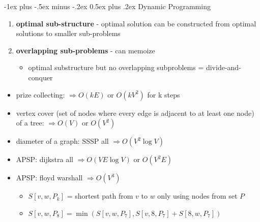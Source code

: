 \documentclass[10pt, landscape]{article}
\makeatletter
\renewcommand{\section}{\@startsection{section}{1}{0mm}%
                                {-1ex plus -.5ex minus -.2ex}%
                                {0.5ex plus .2ex}%
                                {\normalfont\large\bfseries}}
\let\then\Rightarrow
\makeatother
\begin{document}
\begin{minipage}{0.48\linewidth}   
    \begin{multicols}{2}
       \section{Dynamic Programming}
        \begin{enumerate}
            \item \textbf{optimal sub-structure} - optimal solution can be constructed from optimal solutions to smaller sub-problems
            \item \textbf{overlapping sub-problems} - can memoize
            \begin{itemize}
                \item optimal substructure but no overlapping subproblems = divide-and-conquer
            \end{itemize}
        \end{enumerate}
        \begin{itemize}
            \item prize collecting: $\then O(kE)$ or $O(kV^2)$ for k steps
            \item vertex cover (set of nodes where every edge is adjacent to at least one node) of a tree: $\then O(V)$ or $O(V^2)$
            \item diameter of a graph: SSSP all $\then O(V^2 \log V)$
            \item APSP: dijkstra all $\then O(VE\log V)$ or $O(V^2E)$
            \item APSP: floyd warshall $\then O(V^3)$
            \begin{itemize}
                \item $S[v, w, P_k]$ = shortest path from $v$ to $w$ only using nodes from set $P$
                \item ${\scriptstyle S[v, w, P_8] = \min(S[v, w, P_7], S[v, 8, P_7] + S[8, w, P_7])}$
            \end{itemize}
        \end{itemize}
    \end{multicols}
\end{minipage}
\end{document}
